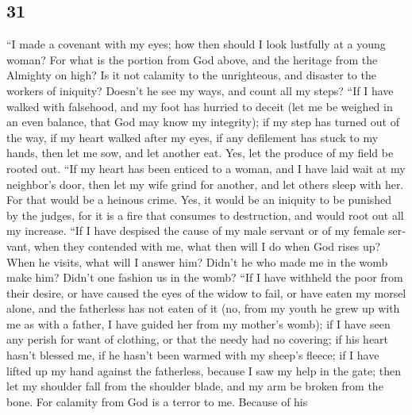 \begin{paracol}{2}
\switchcolumn
\begin{otherlanguage}{english}

\hypertarget{section-61}{%
\section{31}\label{section-61}}

 ``I made a covenant with my eyes; how then should I look
lustfully at a young woman?  For what is the portion from
God above, and the heritage from the Almighty on high?  Is
it not calamity to the unrighteous, and disaster to the workers of
iniquity?  Doesn't he see my ways, and count all my steps?
 ``If I have walked with falsehood, and my foot has
hurried to deceit  (let me be weighed in an even balance,
that God may know my integrity);  if my step has turned
out of the way, if my heart walked after my eyes, if any defilement has
stuck to my hands,  then let me sow, and let another eat.
Yes, let the produce of my field be rooted out.  ``If my
heart has been enticed to a woman, and I have laid wait at my neighbor's
door,  then let my wife grind for another, and let others
sleep with her.  For that would be a heinous crime. Yes,
it would be an iniquity to be punished by the judges, 
for it is a fire that consumes to destruction, and would root out all my
increase.  ``If I have despised the cause of my male
servant or of my female servant, when they contended with me,
 what then will I do when God rises up? When he visits,
what will I answer him?  Didn't he who made me in the
womb make him? Didn't one fashion us in the womb?  ``If I
have withheld the poor from their desire, or have caused the eyes of the
widow to fail,  or have eaten my morsel alone, and the
fatherless has not eaten of it  (no, from my youth he
grew up with me as with a father, I have guided her from my mother's
womb);  if I have seen any perish for want of clothing,
or that the needy had no covering;  if his heart hasn't
blessed me, if he hasn't been warmed with my sheep's fleece;
 if I have lifted up my hand against the fatherless,
because I saw my help in the gate;  then let my shoulder
fall from the shoulder blade, and my arm be broken from the bone.
 For calamity from God is a terror to me. Because of his

\end{otherlanguage}
\end{paracol}

